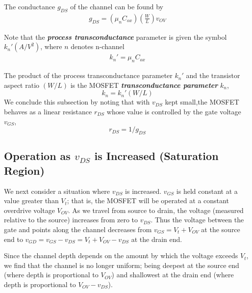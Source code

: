 \documentclass[12pt]{article}
\begin{document}
    The conductance $g_{DS}$ of the channel can be found by
    \begin{align}
        g_{DS} = (\mu_nC_{ox})\left(\frac{W}{L}\right)v_{OV}
    \end{align}

    Note that the \textit{\textbf{process transconductance}} parameter is given the symbol 
    $k_n' (A/V^2)$, where $n$ denotes n-channel
    \begin{align}
        k_n' = \mu_nC_{ox} 
    \end{align}

    The product of the process transconductance parameter $k_n'$ and the transistor aspect ratio
    $(W/L)$ is the MOSFET \textit{\textbf{transconductance parameter}} $k_n$,
    $$k_n = k_n'(W/L)$$
    We conclude this subsection by noting that with $v_{DS}$ kept small,the MOSFET behaves as a 
    linear resistance $r_{DS}$ whose value is controlled by the gate voltage $v_{GS}$,
    $$r_{DS} = 1/g_{DS}$$

    \subsection*{Operation as $v_{DS}$ is Increased (Saturation Region)}

    We next consider a situation where $v_{DS}$ is increased. $v_{GS}$ is held
    constant at a value greater than $V_t$; that is, the MOSFET will be 
    operated at a constant overdrive voltage $V_{OV}$. As we travel from source
    to drain, the voltage (measured relative to the source) increases from zero
    to $v_{DS}$. Thus the voltage between the gate and points along the channel 
    decreases from $v_{GS} = V_t + V_{OV}$ at the source end to $v_{GD} = v_{GS} 
    - v_{DS} = V_t + V_{OV} - v_{DS}$ at the drain end.

    Since the channel depth depends on the amount by which the voltage exceeds 
    $V_t$, we find that the channel is no longer uniform; being deepest at the 
    source end (where depth is proportional to $V_{OV}$) and shallowest at 
    the drain end (where depth is proportional to $V_{OV} - v_{DS}$).
\end{document}
